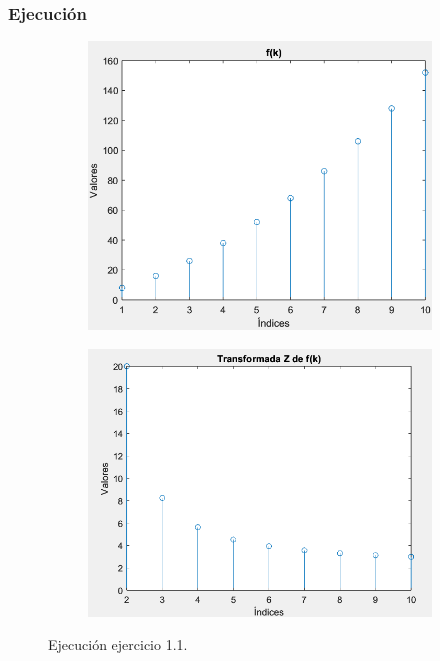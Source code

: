 \documentclass[a4paper, 12pt]{article}
\begin{document}
    \newpage
	\subsubsection*{Ejecución}
    \begin{figure}[ht]
		\begin{subfigure}{0.49\textwidth}
			\centering
			\includegraphics[width=1\textwidth]{figures/Parte2Ej1p1f1.png}
		\end{subfigure}
		\begin{subfigure}{0.49\textwidth}
			\centering
			\includegraphics[width=1\textwidth]{figures/Parte2Ej1p1f2.png}
		\end{subfigure}
    \caption{Ejecución ejercicio 1.1.}
	\end{figure}
\end{document}
